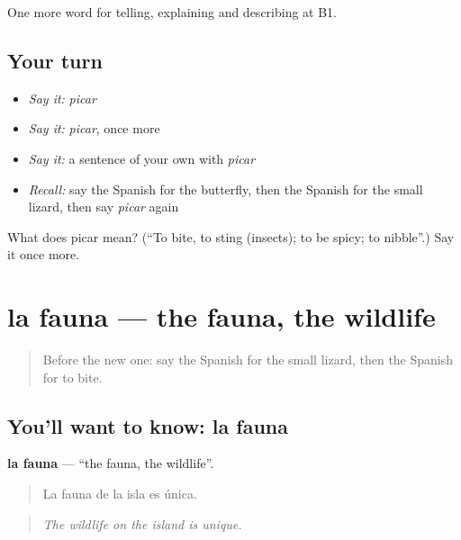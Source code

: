 \begin{grammarlens}[title={What you've built}]
One more word for telling, explaining and describing at B1.
\end{grammarlens}

\subsection*{Your turn}
\begin{itemize}
\raggedright
  \item \emph{Say it:} \emph{picar}
  \item \emph{Say it:} \emph{picar}, once more
  \item \emph{Say it:} a sentence of your own with \emph{picar}
  \item \emph{Recall:} say the Spanish for the butterfly, then the Spanish for the small lizard, then say \emph{picar} again
\end{itemize}

\begin{tcolorbox}[breakable,colback=teal!4,colframe=teal!35!black,title={Before you move on}]
What does picar mean? (\textquotedblleft{}To bite, to sting (insects); to be spicy; to nibble\textquotedblright{}.) Say it once more.
\end{tcolorbox}
\section[la fauna]{la fauna — the fauna, the wildlife}

\label{lesson:ES-C695-fauna}



\begin{quote}
Before the new one: say the Spanish for the small lizard, then the Spanish for to bite.
\end{quote}

\subsection*{You'll want to know: la fauna}
\textbf{la fauna} — \textquotedblleft{}the fauna, the wildlife\textquotedblright{}.

\begin{quote}
La fauna de la isla es única.
\end{quote}

\begin{quote}
\emph{The wildlife on the island is unique.}
\end{quote}

